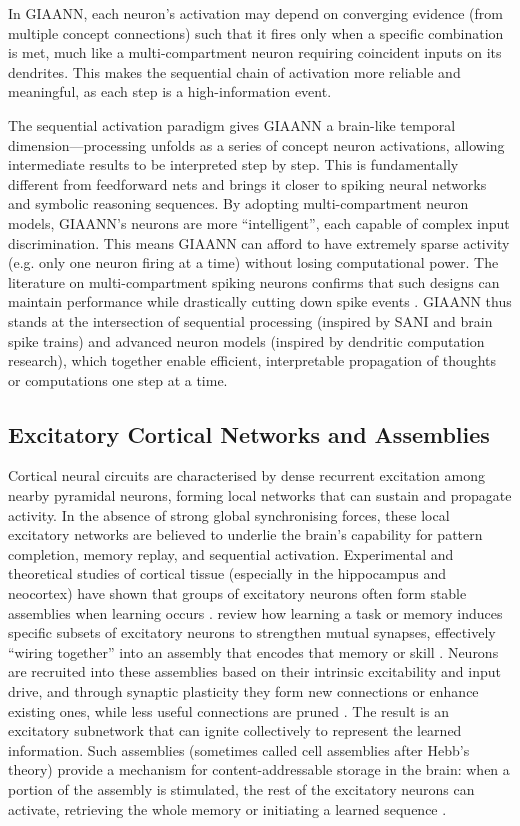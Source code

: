 In GIAANN, each neuron’s activation may depend on converging evidence (from multiple concept connections) such that it fires only when a specific combination is met, much like a multi-compartment neuron requiring coincident inputs on its dendrites. This makes the sequential chain of activation more reliable and meaningful, as each step is a high-information event.

The sequential activation paradigm gives GIAANN a brain-like temporal dimension---processing unfolds as a series of concept neuron activations, allowing intermediate results to be interpreted step by step.
This is fundamentally different from feedforward nets and brings it closer to spiking neural networks and symbolic reasoning sequences.
By adopting multi-compartment neuron models, GIAANN’s neurons are more ``intelligent'', each capable of complex input discrimination.
This means GIAANN can afford to have extremely sparse activity (e.g. only one neuron firing at a time) without losing computational power.
The literature on multi-compartment spiking neurons confirms that such designs can maintain performance while drastically cutting down spike events \citep{leugering2020spiking}.
GIAANN thus stands at the intersection of sequential processing (inspired by SANI and brain spike trains) and advanced neuron models (inspired by dendritic computation research), which together enable efficient, interpretable propagation of thoughts or computations one step at a time.

\subsection{Excitatory Cortical Networks and Assemblies}

Cortical neural circuits are characterised by dense recurrent excitation among nearby pyramidal neurons, forming local networks that can sustain and propagate activity.
In the absence of strong global synchronising forces, these local excitatory networks are believed to underlie the brain’s capability for pattern completion, memory replay, and sequential activation.
Experimental and theoretical studies of cortical tissue (especially in the hippocampus and neocortex) have shown that groups of excitatory neurons often form stable assemblies when learning occurs \citep{holtmaat2016assembly}.
\citet{holtmaat2016assembly} review how learning a task or memory induces specific subsets of excitatory neurons to strengthen mutual synapses, effectively ``wiring together'' into an assembly that encodes that memory or skill \citep{holtmaat2016assembly}.
Neurons are recruited into these assemblies based on their intrinsic excitability and input drive, and through synaptic plasticity they form new connections or enhance existing ones, while less useful connections are pruned \citep{yu2023synapsePruning}.
The result is an excitatory subnetwork that can ignite collectively to represent the learned information.
Such assemblies (sometimes called cell assemblies after Hebb’s theory) provide a mechanism for content-addressable storage in the brain: when a portion of the assembly is stimulated, the rest of the excitatory neurons can activate, retrieving the whole memory or initiating a learned sequence \citep{holtmaat2016assembly}.

